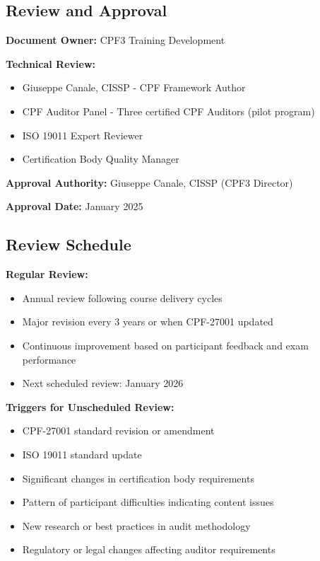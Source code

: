 \documentclass[11pt,a4paper]{article}
\begin{document}
\subsection{Review and Approval}

\textbf{Document Owner:} CPF3 Training Development

\textbf{Technical Review:} 
\begin{itemize}
\item Giuseppe Canale, CISSP - CPF Framework Author
\item CPF Auditor Panel - Three certified CPF Auditors (pilot program)
\item ISO 19011 Expert Reviewer
\item Certification Body Quality Manager
\end{itemize}

\textbf{Approval Authority:} Giuseppe Canale, CISSP (CPF3 Director)

\textbf{Approval Date:} January 2025

\subsection{Review Schedule}

\textbf{Regular Review:}
\begin{itemize}
\item Annual review following course delivery cycles
\item Major revision every 3 years or when CPF-27001 updated
\item Continuous improvement based on participant feedback and exam performance
\item Next scheduled review: January 2026
\end{itemize}

\textbf{Triggers for Unscheduled Review:}
\begin{itemize}
\item CPF-27001 standard revision or amendment
\item ISO 19011 standard update
\item Significant changes in certification body requirements
\item Pattern of participant difficulties indicating content issues
\item New research or best practices in audit methodology
\item Regulatory or legal changes affecting auditor requirements
\end{itemize}
\end{document}
